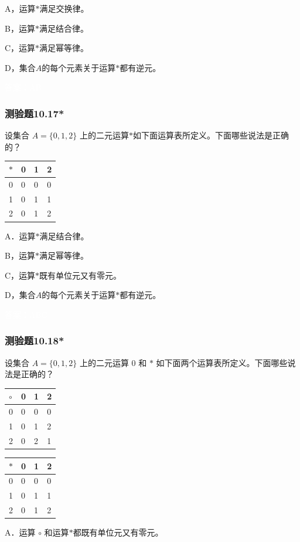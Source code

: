 \documentclass[UTF8, heading=true]{ctexart}
\begin{document}
A，运算$*$满足交换律。

B，运算$*$满足结合律。

C，运算$*$满足幂等律。

D，集合$A$的每个元素关于运算$*$都有逆元。

\textcolor{white}{答案：AB}

\subsubsection{测验题10.17*}

设集合 $A=\{0,1,2\}$ 上的二元运算$*$如下面运算表所定义。下面哪些说法是正确的？

\begin{table}[H]
  \renewcommand{\arraystretch}{1.5}
  \centering
\begin{tabular}{l|lll}
\hline$*$ & 0 & 1 & 2 \\
\hline 0 & 0 & 0 & 0 \\
1 & 0 & 1 & 1 \\
2 & 0 & 1 & 2 \\
\hline
\end{tabular}
\end{table}

A．运算$*$满足结合律。

B，运算$*$满足幂等律。

C，运算$*$既有单位元又有零元。

D，集合$A$的每个元素关于运算$*$都有逆元。

\textcolor{white}{答案：ABC}

\subsubsection{测验题10.18*}

设集合 $A=\{0,1,2\}$ 上的二元运算 0 和 $*$ 如下面两个运算表所定义。下面哪些说法是正确的？
  \begin{table}[H]
    \renewcommand{\arraystretch}{1.5}
    \centering
\begin{minipage}{0.45\textwidth}

  \begin{tabular}{l|lll}
  \hline
  $\circ$ & 0 & 1 & 2 \\
  \hline
  0 & 0 & 0 & 0 \\
  1 & 0 & 1 & 2 \\
  2 & 0 & 2 & 1 \\
  \hline
  \end{tabular}
\end{minipage}
\begin{minipage}{0.45\textwidth}
  \begin{tabular}{l|lll}
  \hline
  $*$ & 0 & 1 & 2 \\
  \hline
  0 & 0 & 0 & 0 \\
  1 & 0 & 1 & 1 \\
  2 & 0 & 1 & 2 \\
  \hline
  \end{tabular}

\end{minipage}
\end{table}
A．运算 $\circ$ 和运算$*$都既有单位元又有零元。
\end{document}
